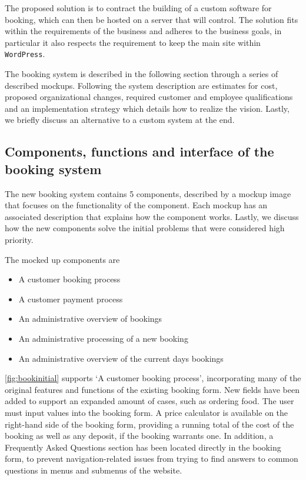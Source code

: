 The proposed solution is to contract the building of a custom software for
booking, which can then be hosted on a server that \gomonkey{} will
control. The solution fits within the requirements of the business and adheres
to the business goals, in particular it also respects the requirement to keep
the main site within \texttt{WordPress}.

The booking system is described in the following section through a series of
described mockups. Following the system description are estimates for cost,
proposed organizational changes, required customer and employee qualifications
and an implementation strategy which details how to realize the vision. Lastly,
we briefly discuss an alternative to a custom system at the end.

\subsection{Components, functions and interface of the booking system}
The new booking system contains 5 components, described by a mockup image that
focuses on the functionality of the component. Each mockup has an associated
description that explains how the component works. Lastly, we discuss how the
new components solve the initial problems that were considered high priority.

The mocked up components are
\begin{itemize}
    \item A customer booking process
    \item A customer payment process
    \item An administrative overview of bookings
    \item An administrative processing of a new booking
    \item An administrative overview of the current days bookings
\end{itemize}

\autoref{fig:bookinitial} supports `A customer booking process', incorporating
many of the original features and functions of the existing booking form. New
fields have been added to support an expanded amount of cases, such as ordering
food. The user must input values into the booking form. A price calculator is
available on the right-hand side of the booking form, providing a running total
of the cost of the booking as well as any deposit, if the booking warrants one.
In addition, a Frequently Asked Questions section has been located directly in
the booking form, to prevent navigation-related issues from trying to find
answers to common questions in menus and submenus of the website.

